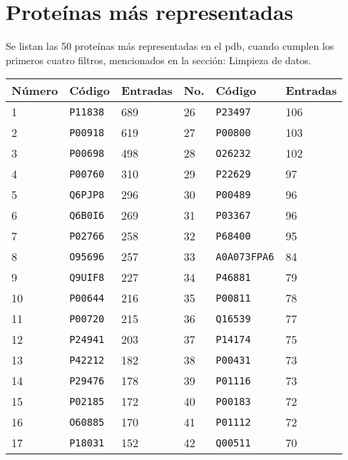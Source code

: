 \chapter{Proteínas más representadas}

Se listan las 50 proteínas más representadas en el \acrshort{pdb}, cuando cumplen los primeros cuatro filtros, mencionados en la sección: Limpieza de datos.

\begin{table}[h]
	\centering
	\begin{tabular}{@{}llllll@{}}
	\toprule
	Número & Código    & Entradas & No. & Código       & Entradas \\* \midrule

1      & \texttt{P11838} & 689    & 26     & \texttt{P23497}     & 106  \\
2      & \texttt{P00918} & 619    & 27     & \texttt{P00800}     & 103  \\
3      & \texttt{P00698} & 498    & 28     & \texttt{O26232}     & 102  \\
4      & \texttt{P00760} & 310    & 29     & \texttt{P22629}     & 97   \\
5      & \texttt{Q6PJP8} & 296    & 30     & \texttt{P00489}     & 96   \\
6      & \texttt{Q6B0I6} & 269    & 31     & \texttt{P03367}     & 96   \\
7      & \texttt{P02766} & 258    & 32     & \texttt{P68400}     & 95   \\
8      & \texttt{O95696} & 257    & 33     & \texttt{A0A073FPA6} & 84   \\
9      & \texttt{Q9UIF8} & 227    & 34     & \texttt{P46881}     & 79   \\
10     & \texttt{P00644} & 216    & 35     & \texttt{P00811}     & 78   \\
11     & \texttt{P00720} & 215    & 36     & \texttt{Q16539}     & 77   \\
12     & \texttt{P24941} & 203    & 37     & \texttt{P14174}     & 75   \\
13     & \texttt{P42212} & 182    & 38     & \texttt{P00431}     & 73   \\
14     & \texttt{P29476} & 178    & 39     & \texttt{P01116}     & 73   \\
15     & \texttt{P02185} & 172    & 40     & \texttt{P00183}     & 72   \\
16     & \texttt{O60885} & 170    & 41     & \texttt{P01112}     & 72   \\
17     & \texttt{P18031} & 152    & 42     & \texttt{Q00511}     & 70   \\

\end{tabular}
\end{table}
